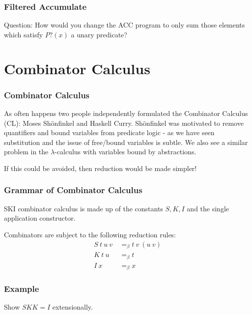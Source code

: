 \documentclass{beamer}
\begin{document}
\begin{frame}
	\frametitle{Filtered Accumulate}

	Question: How would you change the ACC program to only sum those elements which satisfy $P?(x)$ a unary predicate?

	\vspace{70mm}

\end{frame}

\section{Combinator Calculus}

\begin{frame}
	\frametitle{Combinator Calculus}

	As often happens two people independently formulated the Combinator Calculus (CL): Moses Sh\"{o}nfinkel and Haskell Curry. Sh\"{o}nfinkel was motivated to remove quantifiers and bound variables from predicate logic - as we have seen substitution and the issue of free/bound variables is subtle. We also see a similar problem in the $\lambda$-calculus with variables bound by abstractions. 

	If this could be avoided, then reduction would be made simpler!

\end{frame}

\begin{frame}
	\frametitle{Grammar of Combinator Calculus}

	SKI combinator calculus is made up of the constants $S,K,I$ and the single application constructor. 


	\vspace{30mm}

	Combinators are subject to the following reduction rules:
	\begin{align*}
		S \ t \ u \ v \ &=_{\beta} t \ v \ (u \ v) \\
		K \ t \ u \ &=_\beta t \\
		I \ x &=_\beta x
	\end{align*}
\end{frame}

\begin{frame}
	\frametitle{Example}

	Show $SKK = I$ extensionally. 

	\vspace{70mm}

\end{frame}
\end{document}

